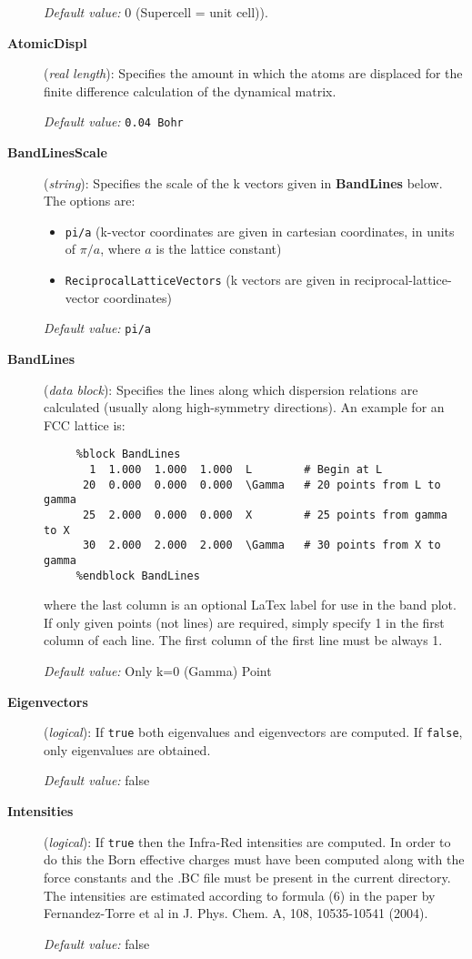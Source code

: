 \begin{description}
{\it Default value:} 0 (Supercell = unit cell)).

\item[{\bf AtomicDispl}] ({\it real length}): 
Specifies the amount in which the atoms are displaced
for the finite difference calculation of the dynamical
matrix.

{\it Default value:} {\tt 0.04 Bohr}

\item[{\bf BandLinesScale}] ({\it string}): 
Specifies the scale of the k vectors given in {\bf BandLines} below.
The options are:
\begin{itemize}
\item {\tt pi/a} (k-vector coordinates are given in cartesian 
coordinates, in units of $\pi/a$, where $a$ is the lattice constant)
\item {\tt ReciprocalLatticeVectors} (k vectors are given in
reciprocal-lattice-vector coordinates)
\end{itemize}

{\it Default value:} {\tt pi/a}


\item[{\bf BandLines}] ({\it data block}): 
Specifies the lines along which dispersion relations are calculated
(usually along high-symmetry directions).
An example for an FCC lattice is:

\begin{verbatim}
     %block BandLines
       1  1.000  1.000  1.000  L        # Begin at L
      20  0.000  0.000  0.000  \Gamma   # 20 points from L to gamma
      25  2.000  0.000  0.000  X        # 25 points from gamma to X
      30  2.000  2.000  2.000  \Gamma   # 30 points from X to gamma
     %endblock BandLines
\end{verbatim}

where the last column is an optional LaTex label for use in the band plot.
If only given points (not lines) are required, simply specify 1 in the
first column of each line. The first column of the first line must be 
always 1.

{\it Default value:} {Only k=0 (Gamma) Point}

\item[{\bf Eigenvectors}] ({\it logical}): If {\tt true} both eigenvalues
and eigenvectors are computed. If {\tt false},  only eigenvalues
are obtained.

{\it Default value:} false

\item[{\bf Intensities}] ({\it logical}): If {\tt true} then the Infra-Red
intensities are computed. In order to do this the Born effective charges
must have been computed along with the force constants and the .BC file
must be present in the current directory. The intensities are estimated 
according to formula (6) in the paper by Fernandez-Torre et al in J. Phys.
Chem. A, 108, 10535-10541 (2004).

{\it Default value:} false

\end{description}


